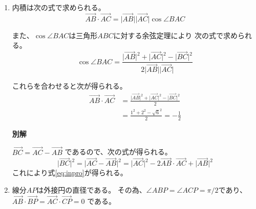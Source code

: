 \documentclass[12pt,b5paper]{ltjsarticle}
\begin{document}
\hrulefill
\begin{enumerate}
 \item
      内積は次の式で求められる。
      \begin{equation}
       \overrightarrow{AB}\cdot\overrightarrow{AC}
        =
        \lvert \overrightarrow{AB} \rvert
        \lvert \overrightarrow{AC} \rvert
        \cos{\angle{BAC}}
      \end{equation}

      また、$\cos{\angle{BAC}}$は三角形$ABC$に対する余弦定理により
      次の式で求められる。
      \begin{equation}
       \cos{\angle{BAC}}
        =
        \frac{\lvert \overrightarrow{AB} \rvert^{2} + \lvert \overrightarrow{AC} \rvert^{2} - \lvert \overrightarrow{BC} \rvert^{2}}{2\lvert \overrightarrow{AB} \rvert\lvert \overrightarrow{AC} \rvert}
      \end{equation}

      これらを合わせると次が得られる。
      \begin{align}
       \overrightarrow{AB}\cdot\overrightarrow{AC}
        &=
        \frac{\lvert \overrightarrow{AB} \rvert^{2} + \lvert \overrightarrow{AC} \rvert^{2} - \lvert \overrightarrow{BC} \rvert^{2}}{2} \label{eq:inpro}\\
       &= \frac{1^{2}+2^{2}-\sqrt{6}^{2}}{2}
       = -\frac{1}{2}
      \end{align}

      \dotfill

      \textbf{別解}

      $\overrightarrow{BC} = \overrightarrow{AC} - \overrightarrow{AB}$
      であるので、次の式が得られる。
      \begin{equation}
       \lvert \overrightarrow{BC} \rvert^{2}
       = \lvert \overrightarrow{AC} - \overrightarrow{AB} \rvert^{2}
       = \lvert \overrightarrow{AC} \rvert^{2} -2\overrightarrow{AB}\cdot\overrightarrow{AC} + \lvert \overrightarrow{AB} \rvert^{2}
      \end{equation}
      これにより式\eqref{eq:inpro}が得られる。

      \hrulefill

 \item
      線分$AP$は外接円の直径である。
      その為、$\angle{ABP}=\angle{ACP}=\pi/2$であり、
      $\overrightarrow{AB} \cdot \overrightarrow{BP}
      = \overrightarrow{AC} \cdot \overrightarrow{CP} = 0$
      である。


\end{enumerate}
\end{document}
